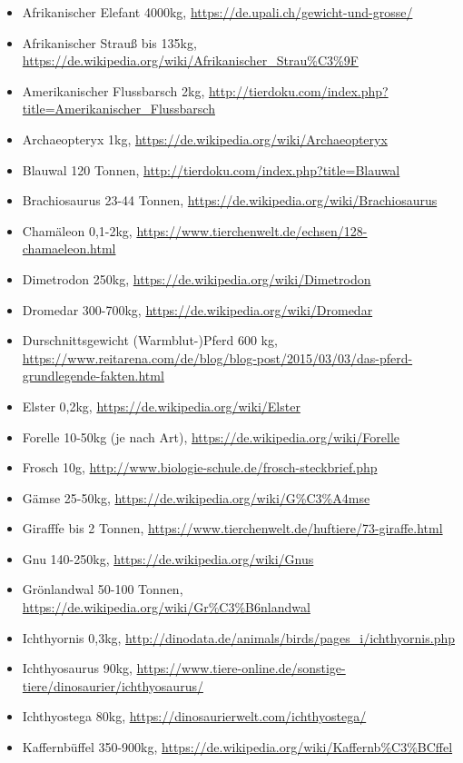  \begin{itemize}
  \item Afrikanischer Elefant 4000kg, \url{https://de.upali.ch/gewicht-und-grosse/}
  \item Afrikanischer Strauß bis 135kg, \url{https://de.wikipedia.org/wiki/Afrikanischer_Strau\%C3\%9F}
  \item Amerikanischer Flussbarsch 2kg, \url{http://tierdoku.com/index.php?title=Amerikanischer_Flussbarsch}
  \item Archaeopteryx 1kg, \url{https://de.wikipedia.org/wiki/Archaeopteryx}
  \item Blauwal 120 Tonnen, \url{http://tierdoku.com/index.php?title=Blauwal}
  \item Brachiosaurus 23-44 Tonnen, \url{https://de.wikipedia.org/wiki/Brachiosaurus}
  \item Chamäleon 0,1-2kg, \url{https://www.tierchenwelt.de/echsen/128-chamaeleon.html}
  \item Dimetrodon 250kg, \url{https://de.wikipedia.org/wiki/Dimetrodon}
  \item Dromedar 300-700kg, \url{https://de.wikipedia.org/wiki/Dromedar}
  \item Durschnittsgewicht (Warmblut-)Pferd 600 kg, \url{https://www.reitarena.com/de/blog/blog-post/2015/03/03/das-pferd-grundlegende-fakten.html}
  \item Elster 0,2kg, \url{https://de.wikipedia.org/wiki/Elster}
  \item Forelle 10-50kg (je nach Art), \url{https://de.wikipedia.org/wiki/Forelle}
  \item Frosch 10g, \url{http://www.biologie-schule.de/frosch-steckbrief.php}
  \item Gämse 25-50kg, \url{https://de.wikipedia.org/wiki/G\%C3\%A4mse}
  \item Girafffe bis 2 Tonnen, \url{https://www.tierchenwelt.de/huftiere/73-giraffe.html}
  \item Gnu 140-250kg, \url{https://de.wikipedia.org/wiki/Gnus}
  \item Grönlandwal 50-100 Tonnen, \url{https://de.wikipedia.org/wiki/Gr\%C3\%B6nlandwal}
  \item Ichthyornis 0,3kg, \url{http://dinodata.de/animals/birds/pages_i/ichthyornis.php}
  \item Ichthyosaurus 90kg, \url{https://www.tiere-online.de/sonstige-tiere/dinosaurier/ichthyosaurus/}
  \item Ichthyostega 80kg, \url{https://dinosaurierwelt.com/ichthyostega/}
  \item Kaffernbüffel 350-900kg, \url{https://de.wikipedia.org/wiki/Kaffernb\%C3\%BCffel}

\end{itemize}
